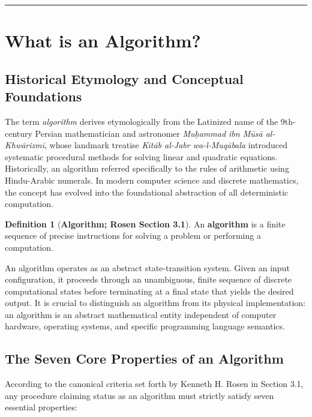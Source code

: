 \documentclass[10pt,a4paper]{article}
\theoremstyle{definition}
\newtheorem{definition}{Definition}[section]
\begin{document}
\vspace{-6pt}
\setcounter{tocdepth}{2}
\tableofcontents
\vspace{6pt}
\hrule
\vspace{8pt}

\section{What is an Algorithm?}

\subsection{Historical Etymology and Conceptual Foundations}
The term \textit{algorithm} derives etymologically from the Latinized name of the 9th-century Persian mathematician and astronomer \textit{Mu\d{h}ammad ibn M\=us\=a al-Khw\=arizm\=i}, whose landmark treatise \textit{Kit\=ab al-Jabr wa-l-Muq\=abala} introduced systematic procedural methods for solving linear and quadratic equations. Historically, an algorithm referred specifically to the rules of arithmetic using Hindu-Arabic numerals. In modern computer science and discrete mathematics, the concept has evolved into the foundational abstraction of all deterministic computation.

\begin{definition}[\textbf{Algorithm; Rosen Section 3.1}]
An \textbf{algorithm} is a finite sequence of precise instructions for solving a problem or performing a computation.
\end{definition}

An algorithm operates as an abstract state-transition system. Given an input configuration, it proceeds through an unambiguous, finite sequence of discrete computational states before terminating at a final state that yields the desired output. It is crucial to distinguish an algorithm from its physical implementation: an algorithm is an abstract mathematical entity independent of computer hardware, operating systems, and specific programming language semantics.

\subsection{The Seven Core Properties of an Algorithm}
According to the canonical criteria set forth by Kenneth H. Rosen in Section 3.1, any procedure claiming status as an algorithm must strictly satisfy seven essential properties:
\end{document}
